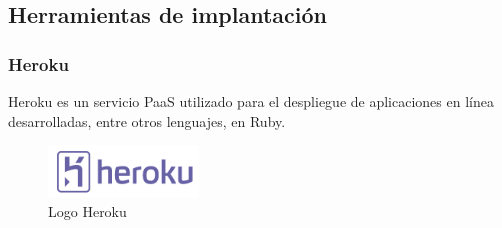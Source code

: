 	\subsection{Herramientas de implantación}
		\subsubsection{Heroku}
		Heroku es un servicio \ac{PaaS} utilizado para el despliegue de aplicaciones en línea desarrolladas, entre otros lenguajes, en Ruby.
				
		\begin{figure}[H]
		\centering
		\includegraphics[width=40mm, fbox={\fboxrule} 4mm]{images/04-metodo/37-heroku_logo.png}
		\caption{Logo Heroku}
		\label{fig:heroku-logo}
		\end{figure}
	

